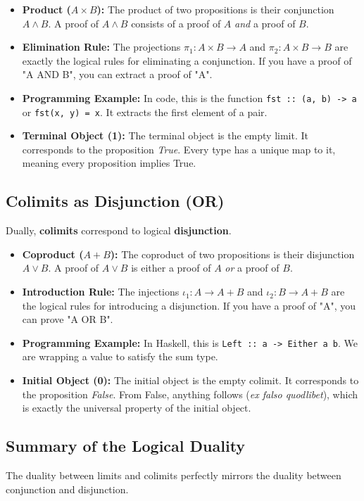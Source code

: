 \documentclass{article}
\begin{document}
\begin{itemize}
    \item \textbf{Product ($A \times B$):} The product of two propositions is their conjunction \(A \land B\). A proof of \(A \land B\) consists of a proof of \(A\) \textit{and} a proof of \(B\). 
    \item \textbf{Elimination Rule:} The projections \(\pi_1 : A \times B \to A\) and \(\pi_2 : A \times B \to B\) are exactly the logical rules for eliminating a conjunction. If you have a proof of "A AND B", you can extract a proof of "A".
    \item \textbf{Programming Example:} In code, this is the function \texttt{fst :: (a, b) -> a} or \texttt{fst(x, y) = x}. It extracts the first element of a pair.
    \item \textbf{Terminal Object (1):} The terminal object is the empty limit. It corresponds to the proposition \textit{True}. Every type has a unique map to it, meaning every proposition implies True.
\end{itemize}

\subsection{Colimits as Disjunction (OR)}
Dually, \textbf{colimits} correspond to logical \textbf{disjunction}.

\begin{itemize}
    \item \textbf{Coproduct ($A + B$):} The coproduct of two propositions is their disjunction \(A \lor B\). A proof of \(A \lor B\) is either a proof of \(A\) \textit{or} a proof of \(B\). 
    \item \textbf{Introduction Rule:} The injections \(\iota_1 : A \to A + B\) and \(\iota_2 : B \to A + B\) are the logical rules for introducing a disjunction. If you have a proof of "A", you can prove "A OR B".
    \item \textbf{Programming Example:} In Haskell, this is \texttt{Left :: a -> Either a b}. We are wrapping a value to satisfy the sum type.
    \item \textbf{Initial Object (0):} The initial object is the empty colimit. It corresponds to the proposition \textit{False}. From False, anything follows (\textit{ex falso quodlibet}), which is exactly the universal property of the initial object.
\end{itemize}

\subsection{Summary of the Logical Duality}
The duality between limits and colimits perfectly mirrors the duality between conjunction and disjunction.
\end{document}
